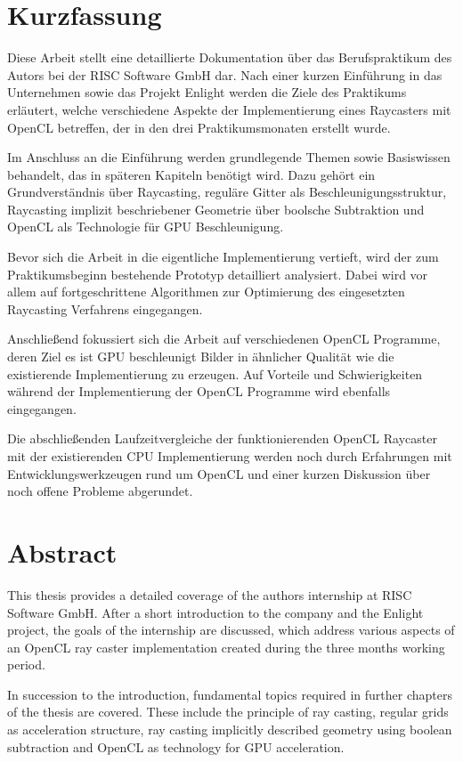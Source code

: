 \section*{Kurzfassung}

Diese Arbeit stellt eine detaillierte Dokumentation über das Berufspraktikum des Autors bei der RISC Software GmbH dar. Nach einer kurzen Einführung in das Unternehmen sowie das Projekt Enlight werden die Ziele des Praktikums erläutert, welche verschiedene Aspekte der Implementierung eines Raycasters mit OpenCL betreffen, der in den drei Praktikumsmonaten erstellt wurde.

Im Anschluss an die Einführung werden grundlegende Themen sowie Basiswissen behandelt, das in späteren Kapiteln benötigt wird. Dazu gehört ein Grundverständnis über Raycasting, reguläre Gitter als Beschleunigungsstruktur, Raycasting implizit beschriebener Geometrie über boolsche Subtraktion und OpenCL als Technologie für GPU Beschleunigung.

Bevor sich die Arbeit in die eigentliche Implementierung vertieft, wird der zum Praktikumsbeginn bestehende Prototyp detailliert analysiert. Dabei wird vor allem auf fortgeschrittene Algorithmen zur Optimierung des eingesetzten Raycasting Verfahrens eingegangen.

Anschließend fokussiert sich die Arbeit auf verschiedenen OpenCL Programme, deren Ziel es ist GPU beschleunigt Bilder in ähnlicher Qualität wie die existierende Implementierung zu erzeugen. Auf Vorteile und Schwierigkeiten während der Implementierung der OpenCL Programme wird ebenfalls eingegangen.

Die abschließenden Laufzeitvergleiche der funktionierenden OpenCL Raycaster mit der existierenden CPU Implementierung werden noch durch Erfahrungen mit Entwicklungswerkzeugen rund um OpenCL und einer kurzen Diskussion über noch offene Probleme abgerundet.

\pagebreak

\section*{Abstract}

This thesis provides a detailed coverage of the authors internship at RISC Software GmbH. After a short introduction to the company and the Enlight project, the goals of the internship are discussed, which address various aspects of an OpenCL ray caster implementation created during the three months working period.

In succession to the introduction, fundamental topics required in further chapters of the thesis are covered. These include the principle of ray casting, regular grids as acceleration structure, ray casting implicitly described geometry using boolean subtraction and OpenCL as technology for GPU acceleration.

